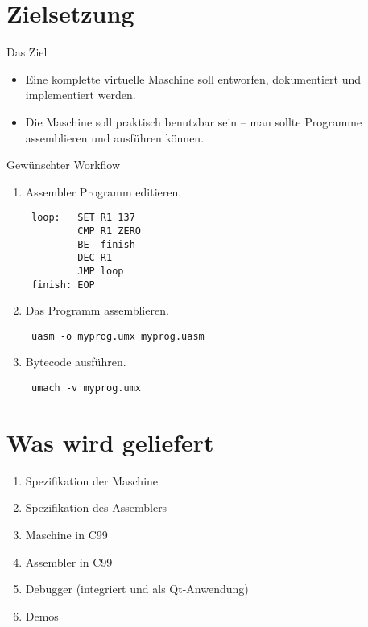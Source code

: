 
\section{Zielsetzung}

\begin{frame}{Das Ziel}
 \begin{itemize}
   \item Eine komplette virtuelle Maschine soll entworfen,
         dokumentiert und implementiert werden.
   \item Die Maschine soll praktisch benutzbar sein -- man sollte Programme
         assemblieren und ausführen können.
 \end{itemize}
\end{frame}

\begin{frame}[fragile]{Gewünschter Workflow}
 \begin{enumerate}
  \item Assembler Programm editieren.
\begin{lstlisting}
 loop:   SET R1 137
         CMP R1 ZERO
         BE  finish
         DEC R1
         JMP loop
 finish: EOP
\end{lstlisting}
  \item Das Programm assemblieren.
\begin{lstlisting}
 uasm -o myprog.umx myprog.uasm
\end{lstlisting}
  \item \glqq{}Bytecode\grqq{} ausführen.
\begin{lstlisting}
 umach -v myprog.umx
\end{lstlisting}
 \end{enumerate}

\end{frame}


\section{Was wird geliefert}

\begin{frame}{\insertsection}
 \begin{enumerate}
  \item Spezifikation der Maschine
  \item Spezifikation des Assemblers
  \item Maschine in C99
  \item Assembler in C99
  \item Debugger (integriert und als Qt-Anwendung)
  \item Demos
 \end{enumerate}
\end{frame}




